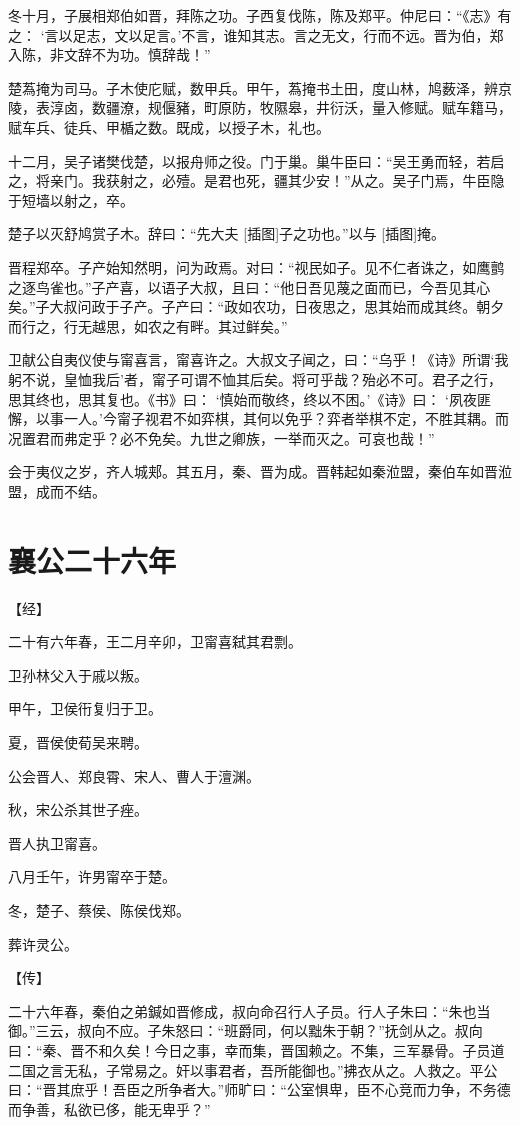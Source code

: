 \documentclass[a4paper,12pt,UTF8,twoside]{ctexbook}
\begin{document}
冬十月，子展相郑伯如晋，拜陈之功。子西复伐陈，陈及郑平。仲尼曰：“《志》有之： ‘言以足志，文以足言。’不言，谁知其志。言之无文，行而不远。晋为伯，郑入陈，非文辞不为功。慎辞哉！”

楚蒍掩为司马。子木使庀赋，数甲兵。甲午，蒍掩书土田，度山林，鸠薮泽，辨京陵，表淳卤，数疆潦，规偃豬，町原防，牧隰皋，井衍沃，量入修赋。赋车籍马，赋车兵、徒兵、甲楯之数。既成，以授子木，礼也。

十二月，吴子诸樊伐楚，以报舟师之役。门于巢。巢牛臣曰：“吴王勇而轻，若启之，将亲门。我获射之，必殪。是君也死，疆其少安！”从之。吴子门焉，牛臣隐于短墙以射之，卒。

楚子以灭舒鸠赏子木。辞曰：“先大夫 [插图]子之功也。”以与 [插图]掩。

晋程郑卒。子产始知然明，问为政焉。对曰：“视民如子。见不仁者诛之，如鹰鹯之逐鸟雀也。”子产喜，以语子大叔，且曰：“他日吾见蔑之面而已，今吾见其心矣。”子大叔问政于子产。子产曰：“政如农功，日夜思之，思其始而成其终。朝夕而行之，行无越思，如农之有畔。其过鲜矣。”

卫献公自夷仪使与甯喜言，甯喜许之。大叔文子闻之，曰：“乌乎！《诗》所谓‘我躬不说，皇恤我后’者，甯子可谓不恤其后矣。将可乎哉？殆必不可。君子之行，思其终也，思其复也。《书》曰： ‘慎始而敬终，终以不困。’《诗》曰： ‘夙夜匪懈，以事一人。’今甯子视君不如弈棋，其何以免乎？弈者举棋不定，不胜其耦。而况置君而弗定乎？必不免矣。九世之卿族，一举而灭之。可哀也哉！”

会于夷仪之岁，齐人城郏。其五月，秦、晋为成。晋韩起如秦涖盟，秦伯车如晋涖盟，成而不结。


\section{襄公二十六年}


【经】

二十有六年春，王二月辛卯，卫甯喜弑其君剽。

卫孙林父入于戚以叛。

甲午，卫侯衎复归于卫。

夏，晋侯使荀吴来聘。

公会晋人、郑良霄、宋人、曹人于澶渊。

秋，宋公杀其世子痤。

晋人执卫甯喜。

八月壬午，许男甯卒于楚。

冬，楚子、蔡侯、陈侯伐郑。

葬许灵公。

【传】

二十六年春，秦伯之弟鍼如晋修成，叔向命召行人子员。行人子朱曰：“朱也当御。”三云，叔向不应。子朱怒曰：“班爵同，何以黜朱于朝？”抚剑从之。叔向曰：“秦、晋不和久矣！今日之事，幸而集，晋国赖之。不集，三军暴骨。子员道二国之言无私，子常易之。奸以事君者，吾所能御也。”拂衣从之。人救之。平公曰：“晋其庶乎！吾臣之所争者大。”师旷曰：“公室惧卑，臣不心竞而力争，不务德而争善，私欲已侈，能无卑乎？”
\end{document}
